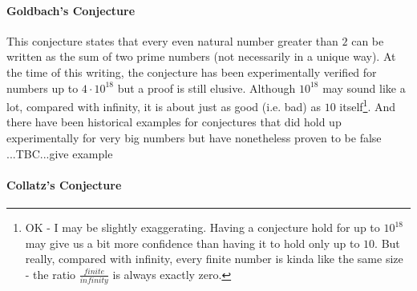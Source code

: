 \paragraph{Goldbach's Conjecture}
This conjecture states that every even natural number greater than $2$ can be written as the sum of two prime numbers (not necessarily in a unique way). At the time of this writing, the conjecture has been experimentally verified for numbers up to $4 \cdot 10^{18}$ but a proof is still elusive. Although $10^{18}$ may sound like a lot, compared with infinity, it is about just as good (i.e. bad) as $10$ itself\footnote{OK - I may be slightly exaggerating. Having a conjecture hold for up to $10^{18}$ may give us a bit more confidence than having it to hold only up to $10$. But really, compared with infinity, every finite number is kinda like the same size - the ratio $\frac{finite}{infinity}$ is always exactly zero.}. And there have been historical examples for conjectures that did hold up experimentally for very big numbers but have nonetheless proven to be false ...TBC...give example



\paragraph{Collatz's Conjecture}

\begin{comment}
-Modular addition and multiplication
-Modular exponentiation, logarithms and roots
-Chinese Remainder Theorem
\end{comment}